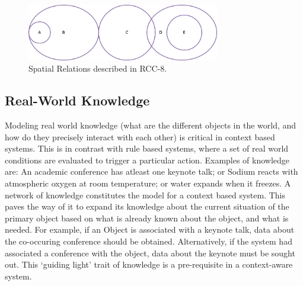 \begin{figure}[t]
\centering
\includegraphics[width=0.75\textwidth]{media/chapter2/rcc8-combined.png}
\caption{Spatial Relations described in RCC-8.}
\label{fig:rcc8}
\end{figure}



\subsection{Real-World Knowledge}
Modeling real world knowledge (what are the different objects in the world, and how do they precisely interact with each other) is critical in context based systems. This is in contrast with rule based systems, where a set of real world conditions are evaluated to trigger a particular action. Examples of knowledge are: An academic conference has atleast one keynote talk; or Sodium reacts with atmospheric oxygen at room temperature; or water expands when it freezes. A network of knowledge constitutes the model for a context based system. This paves the way of it to expand its knowledge about the current situation of the primary object based on what is already known about the object, and what is needed. For example, if an Object is associated with a keynote talk, data about the co-occuring conference should be obtained. Alternatively, if the system had associated a conference with the object, data about the keynote must be sought out. This `guiding light' trait of knowledge is a pre-requisite in a context-aware system.

